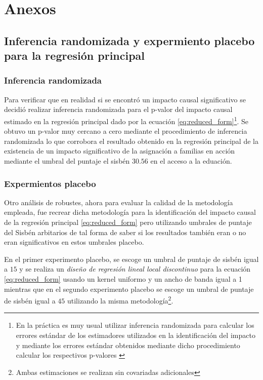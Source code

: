 \documentclass[AER]{AEA}
\begin{document}
\clearpage

\section{Anexos}

\subsection{Inferencia randomizada y expermiento placebo para la regresión principal}

\subsubsection{Inferencia randomizada}

Para verificar que en realidad si se encontró un impacto causal significativo se decidió realizar inferencia randomizada para el p-valor del impacto causal estimado en la regresión principal dado por la ecuación \ref{eq:reduced_form}\footnote{En la práctica es muy usual utilizar inferencia randomizada para calcular los errores estándar de los estimadores utilizados en la identificación del impacto y mediante los errores estándar obtenidos mediante dicho procedimiento calcular los respectivos p-valores \citep{Duflo2017HandbookExperiments}}. Se obtuvo un p-valor muy cercano a cero mediante el procedimiento de inferencia randomizada lo que corrobora el resultado obtenido en la regresión principal de la existencia de un impacto significativo de la asignación a familias en acción mediante el umbral del puntaje el sisbén $30.56$ en el acceso a la eduación. 

\subsubsection{Expermientos placebo}

Otro análisis de robustes, ahora para evaluar la calidad de la metodología empleada, fue recrear dicha metodología para la identificación del impacto causal de la regresión principal \ref{eq:reduced_form} pero utilizando umbrales de puntaje del Sisbén arbitarios de tal forma de saber si los resultados también eran o no eran significativos en estos umbrales placebo. 

En el primer experimento placebo, se escoge un umbral de puntaje de sisbén igual a $15$ y se realiza un \textit{diseño de regresión lineal local discontinuo} para la ecuación \ref{eq:reduced_form} usando un kernel uniformo y un ancho de banda igual a 1 mientras que en el segundo experimento placebo se escoge un umbral de puntaje de sisbén igual a $45$ utilizando la misma metodología\footnote{Ambas estimaciones se realizan sin covariadas adicionales}.
\end{document}
